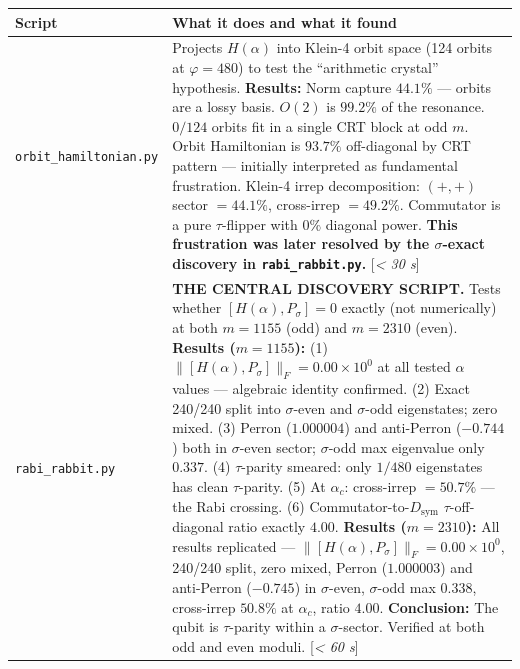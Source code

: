 \documentclass[11pt,letterpaper]{article}
\theoremstyle{definition}
\theoremstyle{remark}
\begin{document}
\begin{longtable}[]{@{}
  >{\raggedright\arraybackslash}p{}
  >{\raggedright\arraybackslash}p{}@{}}
\toprule
Script & What it does and what it found \\
\midrule
\endfirsthead
\endhead
\texttt{orbit\_hamiltonian.py} & Projects $H(\alpha)$ into Klein-4 orbit space (124 orbits at $\varphi = 480$) to test the ``arithmetic crystal'' hypothesis. \textbf{Results:} Norm capture $44.1\%$ --- orbits are a lossy basis. $O(2)$ is $99.2\%$ of the resonance. $0/124$ orbits fit in a single CRT block at odd $m$. Orbit Hamiltonian is $93.7\%$ off-diagonal by CRT pattern --- initially interpreted as fundamental frustration. Klein-4 irrep decomposition: $(+,+)$ sector $= 44.1\%$, cross-irrep $= 49.2\%$. Commutator is a pure $\tau$-flipper with $0\%$ diagonal power. \textbf{This frustration was later resolved by the $\sigma$-exact discovery in \texttt{rabi\_rabbit.py}.} [\textit{\textless{} 30 s}] \\
\texttt{rabi\_rabbit.py} & \textbf{THE CENTRAL DISCOVERY SCRIPT.} Tests whether $[H(\alpha), P_\sigma] = 0$ exactly (not numerically) at both $m = 1155$ (odd) and $m = 2310$ (even). \textbf{Results ($m = 1155$):} (1) $\|[H(\alpha), P_\sigma]\|_F = 0.00 \times 10^{0}$ at all tested $\alpha$ values --- algebraic identity confirmed. (2) Exact 240/240 split into $\sigma$-even and $\sigma$-odd eigenstates; zero mixed. (3) Perron ($1.000004$) and anti-Perron ($-0.744$) both in $\sigma$-even sector; $\sigma$-odd max eigenvalue only $0.337$. (4) $\tau$-parity smeared: only $1/480$ eigenstates has clean $\tau$-parity. (5) At $\alpha_c$: cross-irrep $= 50.7\%$ --- the Rabi crossing. (6) Commutator-to-$D_{\text{sym}}$ $\tau$-off-diagonal ratio exactly $4.00$. \textbf{Results ($m = 2310$):} All results replicated --- $\|[H(\alpha), P_\sigma]\|_F = 0.00 \times 10^{0}$, 240/240 split, zero mixed, Perron ($1.000003$) and anti-Perron ($-0.745$) in $\sigma$-even, $\sigma$-odd max $0.338$, cross-irrep $50.8\%$ at $\alpha_c$, ratio $4.00$. \textbf{Conclusion:} The qubit is $\tau$-parity within a $\sigma$-sector. Verified at both odd and even moduli. [\textit{\textless{} 60 s}] \\

\end{longtable}
\end{document}
